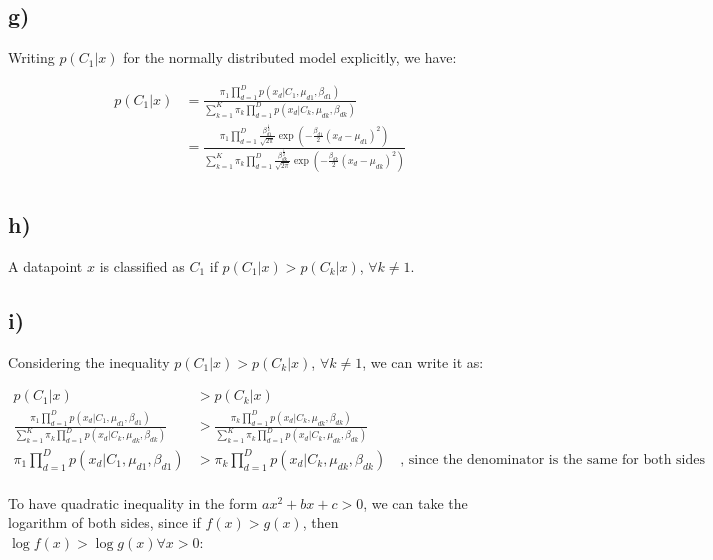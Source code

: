 \documentclass[12pt,a4paper,oneside]{paper}
\begin{document}
\subsection*{g)}

Writing $p(C_1 | x)$ for the normally distributed model explicitly, we have:

\begin{align*}
    p(C_1 | x) &= \frac{\pi_1 \prod_{d=1}^{D} p(x_d | C_1, \mu_{d1}, \beta_{d1})}{\sum_{k=1}^{K} \pi_k \prod_{d=1}^{D} p(x_d | C_k, \mu_{dk}, \beta_{dk})} \\
    &= \frac{\pi_1 \prod_{d=1}^{D} \frac{\beta_{d1}^{\frac{1}{2}}}{\sqrt{2\pi}} \exp\left(-\frac{\beta_{d1}}{2} (x_d - \mu_{d1})^2\right)}{\sum_{k=1}^{K} \pi_k \prod_{d=1}^{D} \frac{\beta_{dk}^{\frac{1}{2}}}{\sqrt{2\pi}} \exp\left(-\frac{\beta_{dk}}{2} (x_d - \mu_{dk})^2\right)} \\
\end{align*}

\subsection*{h)}

A datapoint $x$ is classified as $C_1$ if $p(C_1 | x) > p(C_k | x)$, $\forall k \neq 1$. 

\subsection*{i)}

Considering the inequality $p(C_1 | x) > p(C_k | x)$, $\forall k \neq 1$, we can write it as:

\begin{align*}
    p(C_1 | x) &> p(C_k | x) \\
    \frac{\pi_1 \prod_{d=1}^{D} p(x_d | C_1, \mu_{d1}, \beta_{d1})}{\sum_{k=1}^{K} \pi_k \prod_{d=1}^{D} p(x_d | C_k, \mu_{dk}, \beta_{dk})} &> \frac{\pi_k \prod_{d=1}^{D} p(x_d | C_k, \mu_{dk}, \beta_{dk})}{\sum_{k=1}^{K} \pi_k \prod_{d=1}^{D} p(x_d | C_k, \mu_{dk}, \beta_{dk})} \\
    \pi_1 \prod_{d=1}^{D} p(x_d | C_1, \mu_{d1}, \beta_{d1}) &> \pi_k \prod_{d=1}^{D} p(x_d | C_k, \mu_{dk}, \beta_{dk}) \quad \text{, since the denominator is the same for both sides and it is always positive since it is a sum of probabilities and the probabilities are positive} \\
\end{align*}

To have quadratic inequality in the form $ax^2 + bx + c > 0$, we can take the logarithm of both sides, since if $f(x) > g(x)$, then $\log f(x) > \log g(x) \forall x > 0$:
\end{document}
